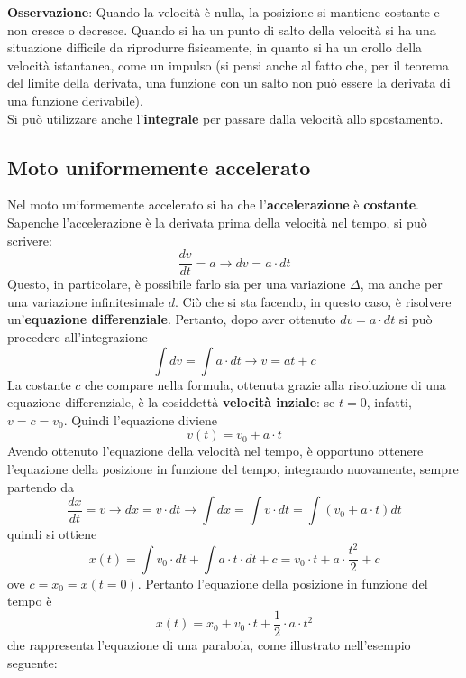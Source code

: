 \documentclass[a4paper]{extarticle}
\begin{document}
\vspace{1em}
\noindent
\textbf{Osservazione}: Quando la velocità è nulla, la posizione si mantiene costante e non cresce o decresce. Quando si ha un punto di salto della velocità si ha una situazione difficile da riprodurre fisicamente, in quanto si ha un crollo della velocità istantanea, come un impulso (si pensi anche al fatto che, per il teorema del limite della derivata, una funzione con un salto non può essere la derivata di una funzione derivabile).\\
Si può utilizzare anche l'\textbf{integrale} per passare dalla velocità allo spostamento.

\vspace{1em}
\subsection{Moto uniformemente accelerato}
Nel moto uniformemente accelerato si ha che l'\textbf{accelerazione} è \textbf{costante}. Sapenche l'accelerazione è la derivata prima della velocità nel tempo, si può scrivere:
\[\frac{dv}{dt} = a \longrightarrow dv = a \cdot dt\]
Questo, in particolare, è possibile farlo sia per una variazione $\Delta$, ma anche per una variazione infinitesimale $d$. Ciò che si sta facendo, in questo caso, è risolvere un'\textbf{equazione differenziale}. Pertanto, dopo aver ottenuto $dv = a \cdot dt$ si può procedere all'integrazione
\[\int dv = \int a \cdot dt \longrightarrow v = at + c\]
La costante $c$ che compare nella formula, ottenuta grazie alla risoluzione di una equazione differenziale, è la cosiddettà \textbf{velocità inziale}: se $t=0$, infatti, $v = c = v_0$. Quindi l'equazione diviene
\[\boxed{v(t) = v_0 + a \cdot t}\]
Avendo ottenuto l'equazione della velocità nel tempo, è opportuno ottenere l'equazione della posizione in funzione del tempo, integrando nuovamente, sempre partendo da
\[\frac{dx}{dt} = v \longrightarrow dx = v \cdot dt \longrightarrow \int dx = \int v \cdot dt = \int (v_0 + a \cdot t) dt\]
quindi si ottiene
\[x(t) = \int v_0 \cdot dt + \int a \cdot t \cdot dt + c = v_0 \cdot t + a \cdot \frac{t^2}{2} + c\]
ove $c = x_0 = x(t=0)$. Pertanto l'equazione della posizione in funzione del tempo è
\[\boxed{x(t) = x_0 + v_0 \cdot t + \frac{1}{2} \cdot a \cdot t^2}\]
che rappresenta l'equazione di una parabola, come illustrato nell'esempio seguente:
\end{document}
